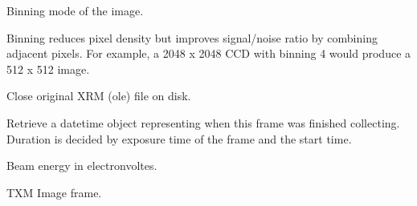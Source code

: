 \documentclass[letterpaper,10pt,english]{sphinxmanual}
\begin{document}
\begin{fulllineitems}

\begin{fulllineitems}
\label{\detokenize{xanespy:xanespy.xradia.XRMFile.binning}}
Binning mode of the image.

Binning reduces pixel density but improves signal/noise ratio
by combining adjacent pixels. For example, a 2048 x 2048 CCD
with binning 4 would produce a 512 x 512 image.

\end{fulllineitems}


\begin{fulllineitems}
\label{\detokenize{xanespy:xanespy.xradia.XRMFile.close}}
Close original XRM (ole) file on disk.

\end{fulllineitems}


\begin{fulllineitems}
\label{\detokenize{xanespy:xanespy.xradia.XRMFile.endtime}}
Retrieve a datetime object representing when this frame was
finished collecting. Duration is decided by exposure time of the frame
and the start time.

\end{fulllineitems}


\begin{fulllineitems}
\label{\detokenize{xanespy:xanespy.xradia.XRMFile.energy}}
Beam energy in electronvoltes.

\end{fulllineitems}


\begin{fulllineitems}
\label{\detokenize{xanespy:xanespy.xradia.XRMFile.image_data}}
TXM Image frame.

\end{fulllineitems}



\end{fulllineitems}
\end{document}
